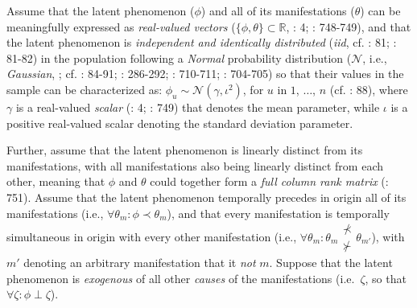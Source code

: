 \documentclass[
  10pt,
  a4paper,
  twoside]{article}
\begin{document}
Assume that the latent phenomenon (\(\phi\)) and all of its manifestations (\(\theta\)) can be meaningfully expressed as \emph{real-valued vectors} (\(\{\phi, \theta\} \subset \mathbb{R}\), : 4; : 748-749), and that the latent phenomenon is \emph{independent and identically distributed} (\emph{iid}, cf. : 81; : 81-82) in the population following a \emph{Normal} probability distribution (\(\mathcal{N}\), i.e., \emph{Gaussian}, ; cf. : 84-91; : 286-292; : 710-711; : 704-705) so that their values in the sample can be characterized as: \(\phi_u \sim \mathcal{N}(\gamma, \iota^2)\), for \(u\) in \(1\), \(\dots\), \(n\) (cf. : 88), where \(\gamma\) is a real-valued \emph{scalar} (: 4; : 749) that denotes the mean parameter, while \(\iota\) is a positive real-valued scalar denoting the standard deviation parameter.

Further, assume that the latent phenomenon is linearly distinct from its manifestations, with all manifestations also being linearly distinct from each other, meaning that \(\phi\) and \(\theta\) could together form a \emph{full column rank matrix} (: 751). Assume that the latent phenomenon temporally precedes in origin all of its manifestations (i.e., \(\forall \theta_m: \phi \prec \theta_m\)), and that every manifestation is temporally simultaneous in origin with every other manifestation (i.e., \(\forall \theta_m: \theta_m \substack{\not \prec \\ \not \succ}  \theta_{m'}\)), with \(m'\) denoting an arbitrary manifestation that it \emph{not} \(m\). Suppose that the latent phenomenon is \emph{exogenous} of all other \emph{causes} of the manifestations (i.e.~\(\zeta\), so that \(\forall \zeta : \phi \perp \zeta\)).
\end{document}
